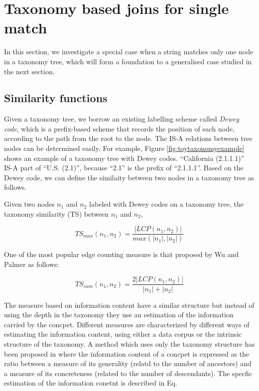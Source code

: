 \section{Taxonomy based joins for single match}
\label{sec:taxo_similarity}

In this section, we investigate a special case when a string matches only one node in a taxonomy tree, which will form a foundation to a generalised case studied in the next section.

\subsection{Similarity functions}

Given a taxonomy tree, we borrow an existing labelling scheme called \textit{Dewey code}, which is a prefix-based scheme that records the position of each node, according to the path from the root to the node. The IS-A relations between tree nodes can be determined easily. For example, Figure \ref{fig:toytaxonomyexample} shows an example of a taxonomy tree with Dewey codes. ``\textsf{California} (2.1.1.1)'' IS-A part of ``\textsf{U.S.} (2.1)'', because ``2.1'' is the prefix of ``2.1.1.1''. Based on the Dewey code, we can define the similaity between two nodes in a taxonomy tree as follows.



Given two nodes $n_1$ and $n_2$ labeled with Dewey codes on a taxonomy tree, the taxonomy similarity (TS) between $n_1$ and $n_2$,

\begin{equation}
 TS_{max}(n_1,n_2) = \frac{|LCP(n_1,n_2)|}{max(|n_1|,|n_2|)}
\end{equation}

\smallskip
\smallskip


One of the most popular edge counting measure is that proposed by Wu and Palmer \cite{conf/acl/WuP94} as follows:

\begin{equation}
TS_{sum}(n_1,n_2) = \frac{2|LCP(n_1,n_2)|}{|n_1|+|n_2|}
\end{equation}

The measure based on information content have a similar structure but instead of using the depth in the taxonomy they use an estimation of the information carried by the concpet. Different measures are characterized by different ways of estimating the information content, using either a data corpus or the intrinsic structure of the taxonomy.  A method which uses only the taxonomy structure has been proposed in \cite{journals/kbs/SanchezBI11}  where the information content of a concpet is expressed as the ratio between a measure of its generality (relatd to the number of ancestors) and a measure of its concreteness (related to the number of descendants). The specfic estimation of the information conetnt is described in Eq.



